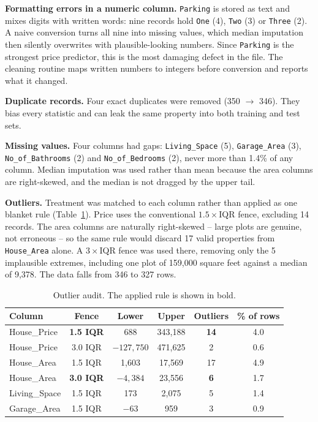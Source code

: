 \documentclass[11pt,a4paper]{article}
\begin{document}
\textbf{Formatting errors in a numeric column.} \texttt{Parking} is stored as text and mixes
digits with written words: nine records hold \texttt{One} (4), \texttt{Two} (3) or
\texttt{Three} (2). A naive conversion turns all nine into missing values, which median
imputation then silently overwrites with plausible-looking numbers. Since \texttt{Parking} is
the strongest price predictor, this is the most damaging defect in the file. The cleaning
routine maps written numbers to integers before conversion and reports what it changed.

\textbf{Duplicate records.} Four exact duplicates were removed (350 $\rightarrow$ 346). They
bias every statistic and can leak the same property into both training and test sets.

\textbf{Missing values.} Four columns had gaps: \texttt{Living\_Space} (5), \texttt{Garage\_Area}
(3), \texttt{No\_of\_Bathrooms} (2) and \texttt{No\_of\_Bedrooms} (2), never more than 1.4\% of
any column. Median imputation was used rather than mean because the area columns are
right-skewed, and the median is not dragged by the upper tail.

\textbf{Outliers.} Treatment was matched to each column rather than applied as one blanket rule
(Table~\ref{tab:outliers}). Price uses the conventional $1.5\times$IQR fence, excluding 14
records. The area columns are naturally right-skewed -- large plots are genuine, not erroneous
-- so the same rule would discard 17 valid properties from \texttt{House\_Area} alone. A
$3\times$IQR fence was used there, removing only the 5 implausible extremes, including one plot
of 159{,}000 square feet against a median of 9{,}378. The data falls from 346 to 327 rows.

\begin{table}[H]
\centering
\small
\caption{Outlier audit. The applied rule is shown in bold.}
\label{tab:outliers}
\begin{tabular}{lccccc}
\toprule
\textbf{Column} & \textbf{Fence} & \textbf{Lower} & \textbf{Upper} & \textbf{Outliers} & \textbf{\% of rows} \\
\midrule
House\_Price  & \textbf{1.5 IQR} & 688 & 343{,}188 & \textbf{14} & 4.0 \\
House\_Price  & 3.0 IQR & $-127{,}750$ & 471{,}625 & 2 & 0.6 \\
House\_Area   & 1.5 IQR & 1{,}603 & 17{,}569 & 17 & 4.9 \\
House\_Area   & \textbf{3.0 IQR} & $-4{,}384$ & 23{,}556 & \textbf{6} & 1.7 \\
Living\_Space & 1.5 IQR & 173 & 2{,}075 & 5 & 1.4 \\
Garage\_Area  & 1.5 IQR & $-63$ & 959 & 3 & 0.9 \\
\bottomrule
\end{tabular}
\end{table}
\end{document}
